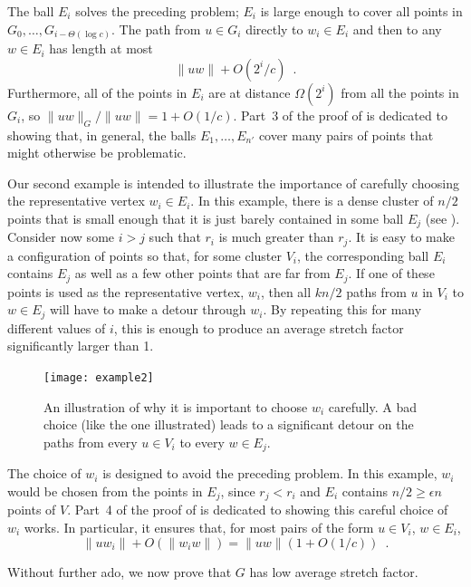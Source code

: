 \documentclass{patmorin}
\begin{document}
The ball $E_i$ solves the preceding problem; $E_i$ is large enough
to cover all points in $G_0,\ldots,G_{i-\Theta(\log c)}$.  The path
from $u\in G_i$ directly to $w_i\in E_i$ and then to any $w\in E_i$
has length at most
\[
    \|uw\| + O(2^{i}/c) \enspace .
\]
Furthermore, all of the points in $E_i$ are at distance $\Omega(2^i)$ from
all the points in $G_i$, so $\|uw\|_G/\|uw\| = 1+O(1/c)$.  Part~3 of the
proof of  is dedicated to showing that, in general,
the balls $E_1,\ldots,E_{n'}$ cover many pairs of points that might
otherwise be problematic.

Our second example is intended to illustrate the importance of carefully
choosing the representative vertex $w_i\in E_i$.   In this example,
there is a dense cluster of $n/2$ points that is small enough that it
is just barely contained in some ball $E_j$ (see ).
Consider now some $i>j$ such that $r_i$ is much greater than $r_j$.
It is easy to make a configuration of points so that, for some cluster
$V_i$, the corresponding ball $E_i$ contains $E_j$ as well as a few 
other points that are far from $E_j$. If one of these
points is used as the representative vertex, $w_i$, then all $kn/2$ paths from
$u$ in $V_i$ to $w\in E_j$ will have to make a detour through $w_i$.
By repeating this for many different values of $i$, this is enough to
produce an average stretch factor significantly larger than 1.

\begin{figure}
  \begin{center}
    \texttt{[image: example2]}
  \end{center}
  \caption{An illustration of why it is important to choose $w_i$ carefully.
    A bad choice (like the one illustrated) leads to a significant detour
    on the paths from every $u\in V_i$ to every $w\in E_j$.}
\end{figure}

The choice of $w_i$ is designed to avoid the preceding problem.  In this
example, $w_i$ would be chosen from the points in $E_j$, since $r_j <
r_i$ and $E_i$ contains $n/2\ge \epsilon n$ points of $V$.  Part~4 of
the proof of  is dedicated to showing this careful
choice of $w_i$ works.  In particular, it ensures that, for most pairs
of the form $u\in V_i$, $w\in E_i$,
\[
    \|uw_i\| + O(\|w_iw\|) = \|uw\|(1+O(1/c)) \enspace .
\]

Without further ado, we now prove that $G$ has low average stretch factor.
\end{document}
